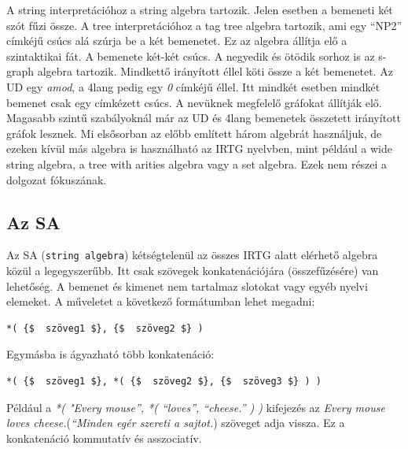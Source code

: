 A string interpretációhoz a string algebra tartozik. Jelen esetben a bemeneti két szót fűzi össze. A tree interpretációhoz a tag tree algebra tartozik, ami egy “NP2” címkéjű csúcs alá szúrja be a két bemenetet. Ez az algebra állítja elő a szintaktikai fát. A bemenete két-két csúcs.  A negyedik és ötödik sorhoz is az s-graph algebra tartozik. Mindkettő irányított éllel köti össze a két bemenetet. Az UD egy \textit{amod}, a 4lang pedig egy \textit{0} címkéjű éllel. Itt mindkét esetben mindkét bemenet csak egy címkézett csúcs. A nevüknek megfelelő gráfokat állítják elő. Magasabb szintű szabályoknál már az UD és 4lang bemenetek összetett irányított gráfok lesznek. Mi elsősorban az előbb említett három algebrát használjuk, de ezeken kívül más algebra is használható az IRTG nyelvben, mint például a wide string algebra, a tree with arities algebra vagy a set algebra. Ezek nem részei a dolgozat fókuszának.



\subsection{Az SA}
\label{sec:sa}
Az SA (\texttt{string algebra}) kétségtelenül az összes IRTG alatt elérhető algebra közül a legegyszerűbb. Itt csak szövegek konkatenációjára (összefűzésére) van lehetőség. A bemenet és kimenet nem tartalmaz slotokat vagy egyéb nyelvi elemeket. A műveletet a következő formátumban lehet megadni:
\begin{verbatim}
*( {$  szöveg1 $}, {$  szöveg2 $} )
\end{verbatim}

Egymásba is ágyazható több konkatenáció:
\begin{verbatim}
*( {$  szöveg1 $}, *( {$  szöveg2 $}, {$  szöveg3 $} ) )
\end{verbatim}

Például a \textit{*( "Every mouse”, *( “loves”, “cheese.” ) )} kifejezés az \textit{Every mouse loves cheese.}(\textit{“Minden egér szereti a sajtot.}) szöveget adja vissza. Ez a konkatenáció kommutatív és asszociatív.



